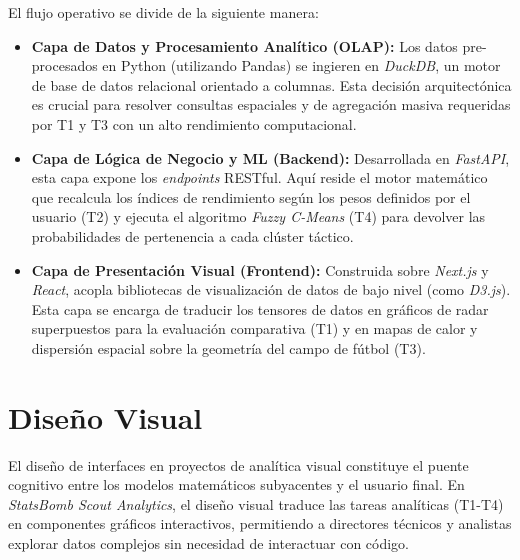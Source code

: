\documentclass[conference]{IEEEtran}
\begin{document}
El flujo operativo se divide de la siguiente manera:
\begin{itemize}
    \item \textbf{Capa de Datos y Procesamiento Analítico (OLAP):} Los datos pre-procesados en Python (utilizando Pandas) se ingieren en \textit{DuckDB}, un motor de base de datos relacional orientado a columnas. Esta decisión arquitectónica es crucial para resolver consultas espaciales y de agregación masiva requeridas por T1 y T3 con un alto rendimiento computacional.
    \item \textbf{Capa de Lógica de Negocio y ML (Backend):} Desarrollada en \textit{FastAPI}, esta capa expone los \textit{endpoints} RESTful. Aquí reside el motor matemático que recalcula los índices de rendimiento según los pesos definidos por el usuario (T2) y ejecuta el algoritmo \textit{Fuzzy C-Means} (T4) para devolver las probabilidades de pertenencia a cada clúster táctico.
    \item \textbf{Capa de Presentación Visual (Frontend):} Construida sobre \textit{Next.js} y \textit{React}, acopla bibliotecas de visualización de datos de bajo nivel (como \textit{D3.js}). Esta capa se encarga de traducir los tensores de datos en gráficos de radar superpuestos para la evaluación comparativa (T1) y en mapas de calor y dispersión espacial sobre la geometría del campo de fútbol (T3).
\end{itemize}


\section{Diseño Visual}

El diseño de interfaces en proyectos de analítica visual constituye el puente cognitivo entre los modelos matemáticos subyacentes y el usuario final. En \textit{StatsBomb Scout Analytics}, el diseño visual traduce las tareas analíticas (T1-T4) en componentes gráficos interactivos, permitiendo a directores técnicos y analistas explorar datos complejos sin necesidad de interactuar con código.
\end{document}
